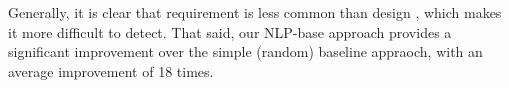 Generally, it is clear that requirement \SATD is less common than design \SATD, which makes it more difficult to detect. That said, our NLP-base approach provides a significant improvement over the simple (random) baseline appraoch, with an average improvement of 18 times.











